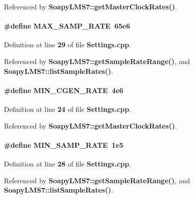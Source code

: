 Referenced by {\bf Soapy\+L\+M\+S7\+::get\+Master\+Clock\+Rates()}.

\paragraph[{M\+A\+X\+\_\+\+S\+A\+M\+P\+\_\+\+R\+A\+TE}]{\setlength{\rightskip}{0pt plus 5cm}\#define M\+A\+X\+\_\+\+S\+A\+M\+P\+\_\+\+R\+A\+TE~65e6}\label{Settings_8cpp_ade06b5df8b607335736d024b55e602fa}


Definition at line {\bf 29} of file {\bf Settings.\+cpp}.



Referenced by {\bf Soapy\+L\+M\+S7\+::get\+Sample\+Rate\+Range()}, and {\bf Soapy\+L\+M\+S7\+::list\+Sample\+Rates()}.

\paragraph[{M\+I\+N\+\_\+\+C\+G\+E\+N\+\_\+\+R\+A\+TE}]{\setlength{\rightskip}{0pt plus 5cm}\#define M\+I\+N\+\_\+\+C\+G\+E\+N\+\_\+\+R\+A\+TE~4e6}\label{Settings_8cpp_a1c8883bc901ee54366a08f55de6deff5}


Definition at line {\bf 24} of file {\bf Settings.\+cpp}.



Referenced by {\bf Soapy\+L\+M\+S7\+::get\+Master\+Clock\+Rates()}.

\paragraph[{M\+I\+N\+\_\+\+S\+A\+M\+P\+\_\+\+R\+A\+TE}]{\setlength{\rightskip}{0pt plus 5cm}\#define M\+I\+N\+\_\+\+S\+A\+M\+P\+\_\+\+R\+A\+TE~1e5}\label{Settings_8cpp_ad266967fa51c3e05f3ad5eaf84d7f055}


Definition at line {\bf 28} of file {\bf Settings.\+cpp}.



Referenced by {\bf Soapy\+L\+M\+S7\+::get\+Sample\+Rate\+Range()}, and {\bf Soapy\+L\+M\+S7\+::list\+Sample\+Rates()}.

